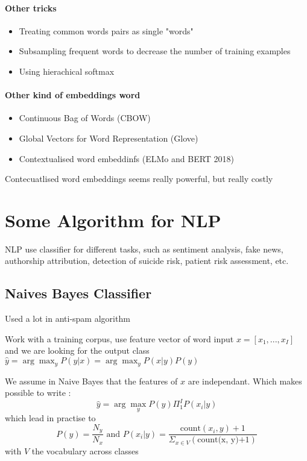 			\paragraph*{Other tricks}
				\begin{itemize}
					\item Treating common words pairs as single "words"
					\item Subsampling frequent words to decrease the number of training examples
					\item Using hierachical softmax
				\end{itemize}

			\paragraph*{Other kind of embeddings word}
				\begin{itemize}
					\item Continuous Bag of Words (CBOW)
					\item Global Vectors for Word Representation (Glove)
					\item Contextualised word embeddinfs (ELMo and BERT 2018)
				\end{itemize}

			Contecuatlised word embeddings seems really powerful, but really costly


	\section{Some Algorithm for NLP}

		NLP use classifier for different tasks, such as sentiment analysis, fake news, authorship  attribution, detection of suicide risk, patient risk assessment, etc.

		\subsection{Naives Bayes Classifier}

			Used a lot in anti-spam algorithm

			Work with a training corpus, use feature vector of word input $x = [x_1, ..., x_I]$
			and we are looking for the output class $\hat y = \arg \max_y P(y|x) = \arg \max_y P(x | y)P(y)$

			We assume in Naive Bayes that the features of $x$ are independant. Which makes possible to write : 
			\[
				\hat y = \arg \max_y P(y) \Pi_1^I P(x_i | y)
			\]
			which lead in practise to
			\[
				P(y) = \frac{N_y}{N_x} \text{ and } P(x_i | y) = \frac{\text{count}(x_i, y)+1}{\Sigma_{x\in V}(\text{count(x, y)+1})}
			\] with $V$ the vocabulary across classes

